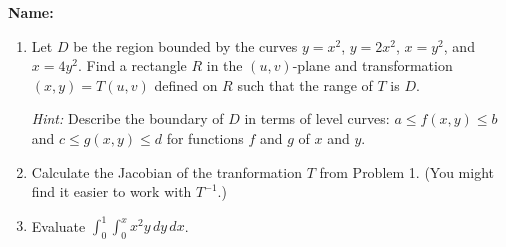 \documentclass[12pt]{article}
\newcommand{\di}{\displaystyle}
\begin{document}
{\bf \Large Name:}
\thispagestyle{fancy}

\bigskip

\begin{enumerate}

 \item Let $D$ be the region bounded by the curves $y=x^2$, $y=2x^2$, $x=y^2$, and $x=4y^2$. Find a rectangle $R$ in the $(u,v)$-plane and transformation $(x,y)=T(u,v)$ defined on $R$ such that the range of $T$ is $D$.

\textit{Hint:} Describe the boundary of $D$ in terms of level curves: $a\leq f(x,y)\leq b$ and $c\leq g(x,y)\leq d$ for functions $f$ and $g$ of $x$ and $y$.

\vspace{2.5in}

 \item Calculate the Jacobian of the tranformation $T$ from Problem 1. (You might find it easier to work with $T^{-1}$.)

\vspace{2.5in}

 \item Evaluate $\di \int_0^1\int_0^x x^2y\,dy\,dx$.



\end{enumerate}
\end{document}
